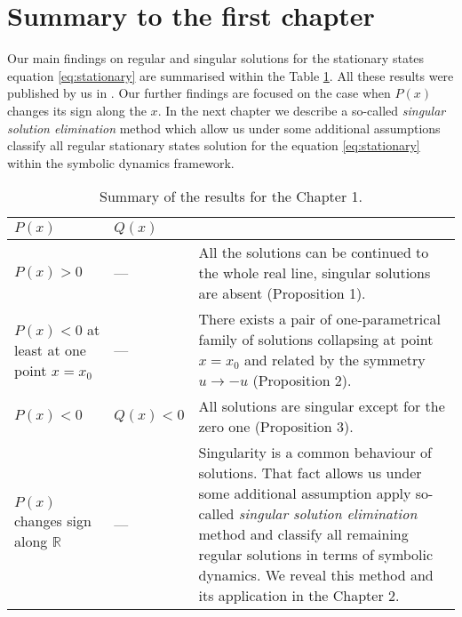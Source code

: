 \section{Summary to the first chapter}

Our main findings on regular and singular solutions for the stationary states equation \eqref{eq:stationary} are summarised within the Table \ref{tab:first-chapter-results}.
All these results were published by us in \cite{AlfimovLebedev}.
Our further findings are focused on the case when $P(x)$ changes its sign along the $x$.
In the next chapter we describe a so-called {\it singular solution elimination} method which allow us under some additional assumptions classify all regular stationary states solution for the equation \eqref{eq:stationary} within the symbolic dynamics framework.

\begin{table}[h!]
	\centering
	\begin{tabular}{ | p{4cm} | l || p{10cm} | }
		\hline
		$P(x)$ & $Q(x)$ & \\
		\hline
		$P(x) > 0$ & --- & All the solutions can be continued to the whole real line, singular solutions are absent (Proposition 1). \\
		\hline
		$P(x) < 0$ at least at one point $x = x_0$ & --- & There exists a pair of one-parametrical family of solutions collapsing at point $x = x_0$ and related by the symmetry $u \to -u$ (Proposition 2). \\
		\hline
		$P(x) < 0$ & $Q(x) < 0$ & All solutions are singular except for the zero one (Proposition 3). \\
		\hline
		$P(x)$ changes sign along $\mathbb{R}$ & --- & Singularity is a common behaviour of solutions.
		That fact allows us under some additional assumption apply so-called {\it singular solution elimination} method and classify all remaining regular solutions in terms of symbolic dynamics.
		We reveal this method and its application in the Chapter 2. \\
		\hline
	\end{tabular}
	\caption{Summary of the results for the Chapter 1.}
	\label{tab:first-chapter-results}
\end{table}
